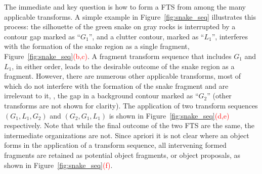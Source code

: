 The immediate and key question is how to form a FTS from among the many applicable transforms. A simple example in Figure~\ref{fig:snake_seq} illustrates this process: the silhouette of the green snake on gray rocks is interrupted by a contour gap marked as ``$G_1$'', and a clutter contour, marked as ``$L_1$'', interferes with the formation of the snake region as a single fragment, Figure~\ref{fig:snake_seq}\textcolor{red}{(b,c)}. A fragment transform sequence that includes $G_1$ and $L_1$, in either order, leads to the desirable outcome of the snake region as a fragment. However, there are numerous other applicable transforms, most of which do not interfere with the formation of the snake fragment and are irrelevant to it, \eg, the gap in a background contour marked as ``$G_2$'' (other transforms are not shown for clarity). The application of two transform sequences $(G_1,L_1,G_2)$ and $(G_2,G_1,L_1)$ is shown in Figure~\ref{fig:snake_seq}\textcolor{red}{(d,e)} respectively. Note that while the final outcome of the two FTS are the same, the intermediate organizations are not. Since apriori it is not clear where an object forms in the application of a transform sequence, all intervening formed fragments are retained as potential object fragments, or object proposals, as shown in Figure~\ref{fig:snake_seq}\textcolor{red}{(f)}. 





